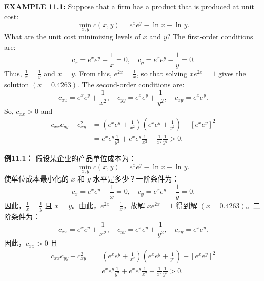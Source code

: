 \begin{original}
\textbf{EXAMPLE 11.1:} Suppose that a firm has a product that is produced at unit cost:
\[
\min_{x,y} c(x, y) = e^x e^y - \ln x - \ln y.
\]
What are the unit cost minimizing levels of $x$ and $y$? The first-order conditions are:
\[
c_x = e^x e^y - \frac{1}{x} = 0, \quad c_y = e^x e^y - \frac{1}{y} = 0.
\]
Thus, $\frac{1}{x} = \frac{1}{y}$ and $x = y$. From this, $e^{2x} = \frac{1}{x}$, so that solving $xe^{2x} = 1$ gives the solution $(x = 0.4263)$. The second-order conditions are:
\[
c_{xx} = e^x e^y + \frac{1}{x^2}, \quad c_{yy} = e^x e^y + \frac{1}{y^2}, \quad c_{xy} = e^x e^y.
\]
So, $c_{xx} > 0$ and
\begin{align*}
c_{xx}c_{yy} - c_{xy}^2 &= \left(e^x e^y + \frac{1}{x^2}\right)\left(e^x e^y + \frac{1}{y^2}\right) - [e^x e^y]^2 \\
&= e^x e^y \frac{1}{y^2} + e^x e^y \frac{1}{x^2} + \frac{1}{x^2}\frac{1}{y^2} > 0.
\end{align*}
\end{original}
\begin{translation}
\textbf{例11.1：} 假设某企业的产品单位成本为：
\[
\min_{x,y} c(x, y) = e^x e^y - \ln x - \ln y.
\]
使单位成本最小化的 $x$ 和 $y$ 水平是多少？一阶条件为：
\[
c_x = e^x e^y - \frac{1}{x} = 0, \quad c_y = e^x e^y - \frac{1}{y} = 0.
\]
因此，$\frac{1}{x} = \frac{1}{y}$ 且 $x = y$。由此，$e^{2x} = \frac{1}{x}$，故解 $xe^{2x} = 1$ 得到解 $(x = 0.4263)$。二阶条件为：
\[
c_{xx} = e^x e^y + \frac{1}{x^2}, \quad c_{yy} = e^x e^y + \frac{1}{y^2}, \quad c_{xy} = e^x e^y.
\]
因此，$c_{xx} > 0$ 且
\begin{align*}
c_{xx}c_{yy} - c_{xy}^2 &= \left(e^x e^y + \frac{1}{x^2}\right)\left(e^x e^y + \frac{1}{y^2}\right) - [e^x e^y]^2 \\
&= e^x e^y \frac{1}{y^2} + e^x e^y \frac{1}{x^2} + \frac{1}{x^2}\frac{1}{y^2} > 0.
\end{align*}
\end{translation}

